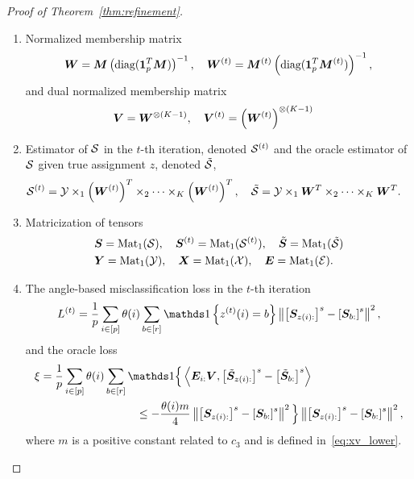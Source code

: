 \documentclass[lettersize,onecolumn,journal]{IEEEtran}
\theoremstyle{definition}
\theoremstyle{definition}
\newcommand{\of}[1]{\left(#1\right)}
\newcommand{\off}[1]{\left[#1\right]}
\newcommand{\offf}[1]{\left\{#1\right\}}
\newcommand{\ang}[1]{\left\langle#1\right\rangle}
\def\fixme#1#2{\textbf{\color{red}[FIXME (#1): #2]}}
\begin{document}
\begin{proof}[Proof of Theorem~\ref{thm:refinement}]
\begin{enumerate}
    \item Normalized membership matrix
    \begin{align}
        \mW = \mM \of{ \text{diag}(\mone_{p}^T \mM) }^{-1}, \quad \mW^{(t)} = \mM^{(t)} \of{ \text{diag}(\mone_{p}^T \mM^{(t)}) }^{-1},
    \end{align}
    and dual normalized membership matrix
    \begin{align}
         \mV &= \mW^{\otimes (K-1)}, \quad \mV^{(t)} =\of{ \mW^{(t)}}^{\otimes (K-1)}
    \end{align}
    \item Estimator of $\mathcal{S}$ in the $t$-th iteration, denoted $\mathcal{S}^{(t)}$ and the oracle estimator of $\mathcal{S}$ given true assignment $z$, denoted $\tilde {\mathcal{S}}$,
    \begin{align}
        \tS^{(t)} = \tY \times_1 \of{\mW^{(t)}}^T \times_2 \cdots \times_K \of{\mW^{(t)}}^T, \quad \tilde \tS &= \tY \times_1 \mW^T \times_2 \cdots \times_K \mW^T.
    \end{align}
    \item Matricization of tensors
    \begin{align}
        &\bm S = \text{Mat}_1(\mathcal{S}), \quad \bm S^{(t)} = \text{Mat}_1(\mathcal{S}^{(t)}), \quad \tilde {\bm S} = \text{Mat}_1(\tilde {\mathcal{S}})\\
        &\bm Y = \text{Mat}_1(\mathcal{Y}), \quad \bm X = \text{Mat}_1(\mathcal{X}), \quad \bm{E} = \text{Mat}_1(\mathcal{E}).
    \end{align}
    \item The angle-based misclassification loss in the $t$-th iteration %
    \begin{equation}
         L^{(t)} = \frac{1}{p}  \sum_{i \in [p]} \theta(i) \sum_{b \in [r]}  \ind \offf{ z^{(t)}(i) = b } \onorm{ \off{ \mS_{ z(i):}  }^s - \off{ \mS_{b:}  }^s  }^2,
    \end{equation}
     and the oracle loss
    \begin{align}
         \xi & = \frac{1}{p} \sum_{i \in [p]} \theta(i) \sum_{b \in [r]} \ind \Big\{\ang{ \mE_{i:} \mV, \off{  \tilde \mS_{z(i):} }^s - \off{  \tilde \mS_{b:} }^s} \\
         & \hspace{3cm}\leq - \frac{ \theta(i) m}{4} \onorm{ \off{ \mS_{z(i):}  }^s - \off{ \mS_{b:}  }^s  }^2 \Big\} \onorm{ \off{ \mS_{z(i):}  }^s - \off{ \mS_{ b:}  }^s  }^2,
    \end{align}
    where $m$ is a positive constant related to $c_3$ and is defined in~\eqref{eq:xv_lower}.
\end{enumerate}


\end{proof}
\end{document}
